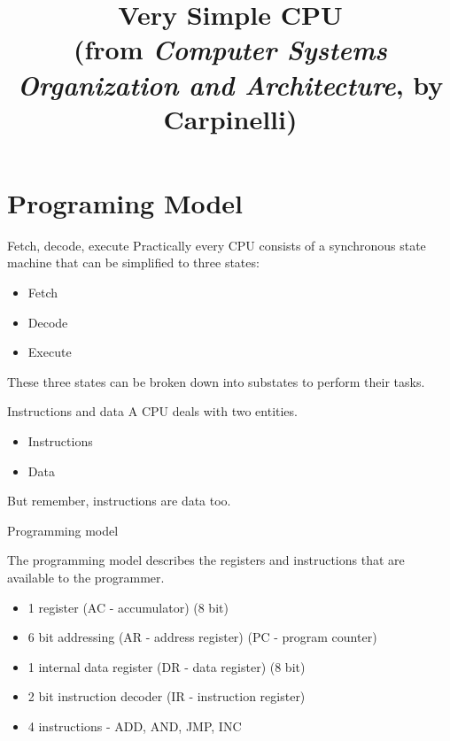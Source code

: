 \title{Very Simple CPU\\(from \emph{Computer Systems Organization and Architecture}, by Carpinelli)}

\section{Programing Model}

\begin{frame}{Fetch, decode, execute}
  Practically every CPU consists of a synchronous state machine that can be simplified to three states:
  \begin{itemize}
    \item Fetch
    \item Decode
    \item Execute
  \end{itemize}
  These three states can be broken down into substates to perform their tasks.
\end{frame}

\begin{frame}{Instructions and data}
  A CPU deals with two entities.
  \begin{itemize}
    \item Instructions
    \item Data
  \end{itemize}
  But remember, instructions are data too.
\end{frame}

\begin{frame}{Programming model}
  \begin{definition}
    The \alert{programming model} describes the registers and instructions that are available to the programmer.
  \end{definition}
  \begin{itemize}
    \item 1 register (AC - accumulator) (8 bit)
    \item 6 bit addressing (AR - address register) (PC - program counter)
    \item 1 internal data register (DR - data register) (8 bit)
    \item 2 bit instruction decoder (IR - instruction register)
    \item 4 instructions - ADD, AND, JMP, INC
  \end{itemize}
\end{frame}

